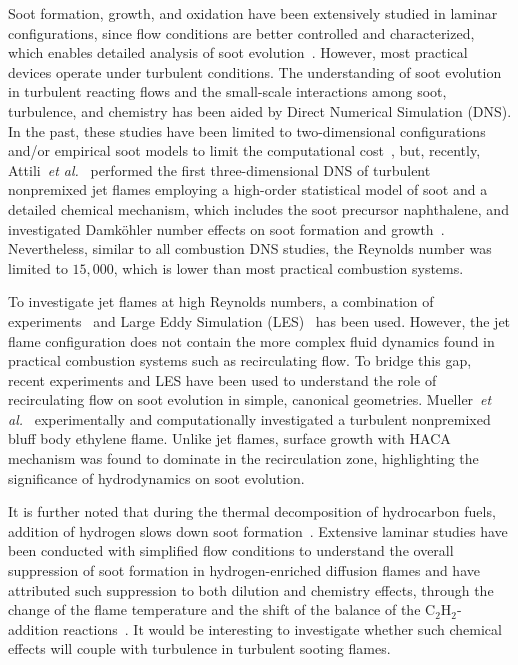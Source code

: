 Soot formation, growth, and oxidation have been extensively studied in laminar configurations, since flow conditions are better controlled and characterized, which enables detailed analysis of soot evolution~\cite{wang11}.  However, most practical devices operate under turbulent conditions.  The understanding of soot evolution in turbulent reacting flows and the small-scale interactions among soot, turbulence, and chemistry has been aided by Direct Numerical Simulation (DNS).  In the past, these studies have been limited to two-dimensional configurations and/or empirical soot models to limit the computational cost~\cite{yoo07,lignell07,lignell08,bisetti12}, but, recently, Attili~\emph{et al.}~\cite{attili14} performed the first three-dimensional DNS of turbulent nonpremixed jet flames employing a high-order statistical model of soot and a detailed chemical mechanism, which includes the soot precursor naphthalene, and investigated Damk\"{o}hler number effects on soot formation and growth~\cite{attili15}.  Nevertheless, similar to all combustion DNS studies, the Reynolds number was limited to $15,000$, which is lower than most practical combustion systems.

To investigate jet flames at high Reynolds numbers, a combination of experiments~\cite{qamar05,qamar09,lee09,zhang11} and Large Eddy Simulation (LES)~\cite{eiasrag09,mueller12,xuan15} has been used.  However, the jet flame configuration does not contain the more complex fluid dynamics found in practical combustion systems such as recirculating flow.  To bridge this gap, recent experiments and LES have been used to understand the role of recirculating flow on soot evolution in simple, canonical geometries.  Mueller~\emph{et al.}~\cite{mueller13} experimentally and computationally investigated a turbulent nonpremixed bluff body ethylene flame.  Unlike jet flames, surface growth with HACA mechanism was found to dominate in the recirculation zone, highlighting the significance of hydrodynamics on soot evolution.

It is further noted that during the thermal decomposition of hydrocarbon fuels, addition of hydrogen slows down soot formation~\cite{tesner58}.  Extensive laminar studies have been conducted with simplified flow conditions to understand the overall suppression of soot formation in hydrogen-enriched diffusion flames and have attributed such suppression to both dilution and chemistry effects, through the change of the flame temperature and the shift of the balance of the C$_2$H$_2$-addition reactions~\cite{dearden68,du95,gulder96,guo06,zhao14}.  It would be interesting to investigate whether such chemical effects will couple with turbulence in turbulent sooting flames.

